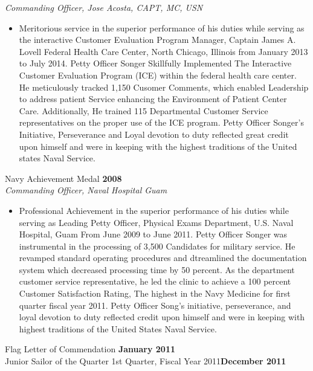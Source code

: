 \documentclass[a4papper,overlapped,line]{res}
\newcommand{\osection}[1]{\section{\sc {\color{MidnightBlue}\vspace{-0.60cm} \textbf{#1}\\}}}
\begin{document}
\begin{resume}
\textit{Commanding Officer, Jose Acosta, CAPT, MC, USN}
\begin{itemize}
	\item Meritorious service in the superior performance of his duties while serving as the interactive Customer Evaluation Program Manager, Captain James A. Lovell Federal Health Care Center, North Chicago, Illinois from January 2013 to July 2014. Petty Officer Songer Skillfully Implemented The Interactive Customer Evaluation Program (ICE) within the federal health care center. He meticulously tracked 1,150 Cusomer Comments, which enabled Leadership to address patient Service enhancing the Environment of Patient Center Care. Additionally, He trained 115 Departmental Customer Service representatives on the proper use of the ICE program. Petty Officer Songer's Initiative, Perseverance and Loyal devotion to duty reflected great credit upon himself and were in keeping with the highest traditions of the United states Naval Service.
\end{itemize}
Navy Achievement Medal \hfill \textbf{2008} \\
\textit{Commanding Officer, Naval Hospital Guam}
\begin{itemize}
	\item Professional Achievement in the superior performance of his duties while serving as Leading Petty Officer, Physical Exams Department, U.S. Naval Hospital, Guam From June 2009 to June 2011. Petty Officer Songer was instrumental in the processing of 3,500 Candidates for military service. He revamped standard operating procedures and dtreamlined the documentation system which decreased processing time by 50 percent. As the department customer service representative, he led the clinic to achieve a 100 percent Customer Satisfaction Rating, The highest in the Navy Medicine for first quarter fiscal year 2011. Petty Officer Song's initiative, perseverance, and loyal devotion to duty reflected credit upon himself and were in keeping with highest traditions of the United States Naval Service.
\end{itemize}
Flag Letter of Commendation \hfill  \textbf{January 2011} \\
Junior Sailor of the Quarter 1st Quarter, Fiscal Year 2011\hfill \textbf{December 2011} \\
\\
\osection{Publications}
\begin{itemize}

\end{itemize}
\end{resume}
\end{document}
